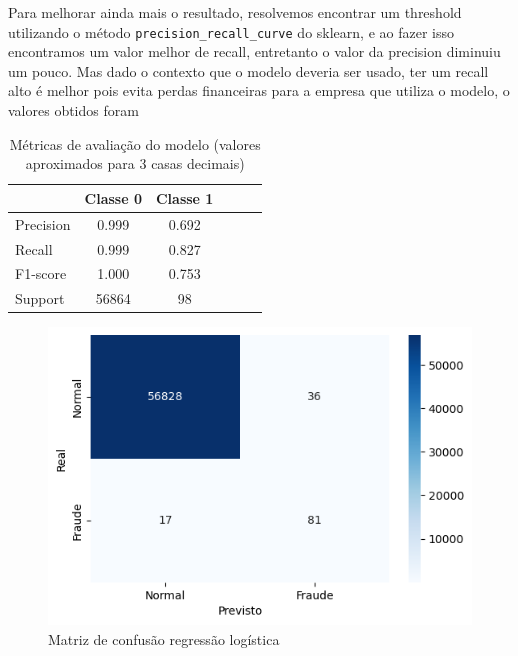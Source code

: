 \documentclass[conference]{IEEEtran}
\begin{document}
  Para melhorar ainda mais o resultado, resolvemos encontrar um threshold utilizando o método \texttt{precision\_recall\_curve} do sklearn, e ao fazer isso encontramos um valor melhor de recall, entretanto o valor da precision diminuiu um pouco. Mas dado o contexto que o modelo deveria ser usado, ter um recall alto é melhor pois evita perdas financeiras para a empresa que utiliza o modelo, o valores obtidos foram
  \begin{table}[tb]
      \caption{Métricas de avaliação do modelo (valores aproximados para 3 casas decimais)}
      \label{tab:matriz_confusao_regressao_logistica_com_threshold}
      \centering
      \begin{tabular}{lccccc}
          \toprule
          & \textbf{Classe 0} & \textbf{Classe 1} \\
          \midrule
          Precision  & 0.999  & 0.692 \\
          Recall     & 0.999  & 0.827 \\
          F1-score   & 1.000  & 0.753 \\
          Support    & 56864  & 98    \\
          \bottomrule
      \end{tabular}
  \end{table}
  \begin{figure}[H]
    \centerline{\includegraphics[width=0.8\linewidth]{../output/matriz de confusao com threshold regressao logistica.png}}
    \caption{Matriz de confusão regressão logística}
    \label{fig:matriz_confusao_regressao_logistica_com_threshold}
  \end{figure}
\end{document}

